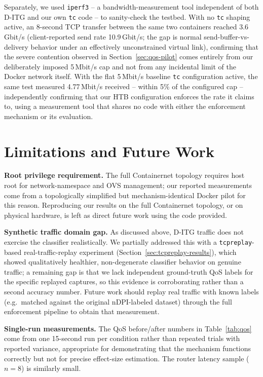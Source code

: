 \documentclass[10pt,twocolumn]{article}
\begin{document}
Separately, we used \texttt{iperf3} -- a bandwidth-measurement tool
independent of both D-ITG and our own \texttt{tc} code -- to sanity-check
the testbed. With no \texttt{tc} shaping active, an 8-second TCP transfer
between the same two containers reached 3.6\,Gbit/s (client-reported send
rate 10.9\,Gbit/s; the gap is normal send-buffer-vs-delivery behavior
under an effectively unconstrained virtual link), confirming that the
severe contention observed in Section~\ref{sec:qos-pilot} comes entirely
from our deliberately imposed 5\,Mbit/s cap and not from any incidental
limit of the Docker network itself. With the flat 5\,Mbit/s baseline
\texttt{tc} configuration active, the same test measured 4.77\,Mbit/s
received -- within 5\% of the configured cap -- independently confirming
that our HTB configuration enforces the rate it claims to, using a
measurement tool that shares no code with either the enforcement
mechanism or its evaluation.

\section{Limitations and Future Work}

\textbf{Root privilege requirement.} The full Containernet topology
requires host root for network-namespace and OVS management; our
reported measurements come from a topologically simplified but
mechanism-identical Docker pilot for this reason. Reproducing our results
on the full Containernet topology, or on physical hardware, is left as
direct future work using the code provided.

\textbf{Synthetic traffic domain gap.} As discussed above, D-ITG traffic
does not exercise the classifier realistically. We partially addressed
this with a \texttt{tcpreplay}-based real-traffic-replay experiment
(Section~\ref{sec:tcpreplay-results}), which showed qualitatively
healthier, non-degenerate classifier behavior on genuine traffic; a
remaining gap is that we lack independent ground-truth QoS labels for the
specific replayed captures, so this evidence is corroborating rather than
a second accuracy number. Future work should replay real traffic with
known labels (e.g.\ matched against the original nDPI-labeled dataset)
through the full enforcement pipeline to obtain that measurement.

\textbf{Single-run measurements.} The QoS before/after numbers in
Table~\ref{tab:qos} come from one 15-second run per condition rather than
repeated trials with reported variance, appropriate for demonstrating
that the mechanism functions correctly but not for precise effect-size
estimation. The router latency sample (\(n=8\)) is similarly small.
\end{document}
